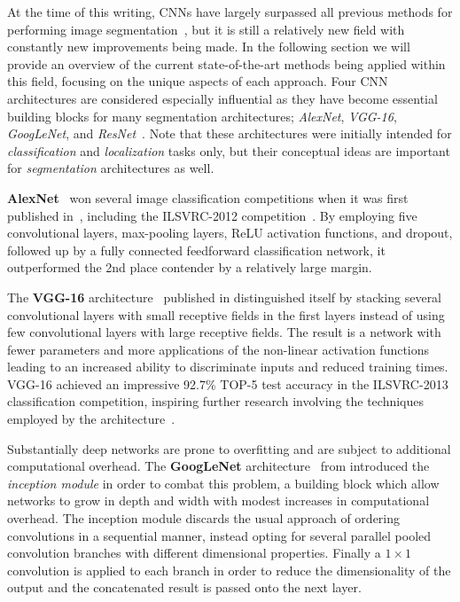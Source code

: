 At the time of this writing, CNNs have largely surpassed all previous methods for performing image segmentation~\cite{segmentation-overview}, but it is still a relatively new field with constantly new improvements being made.
In the following section we will provide an overview of the current state-of-the-art methods being applied within this field, focusing on the unique aspects of each approach.
Four CNN architectures are considered especially influential as they have become essential building blocks for many segmentation architectures; \textit{AlexNet}, \textit{VGG-16}, \textit{GoogLeNet}, and \textit{ResNet}~\cite{segmentation-overview}.
Note that these architectures were initially intended for \textit{classification} and \textit{localization} tasks only, but their conceptual ideas are important for \textit{segmentation} architectures as well.

\textbf{AlexNet}~\cite{segmentation-alexnet} won several image classification competitions when it was first published in~\citeyear{segmentation-alexnet}, including the ILSVRC-2012 competition~\cite{segmentation-overview}.
By employing five convolutional layers, max-pooling layers, ReLU activation functions, and dropout, followed up by a fully connected feedforward classification network, it outperformed the 2nd place contender by a relatively large margin.

The \textbf{VGG-16} architecture~\cite{vgg-16} published in \citeyear{vgg-16} distinguished itself by stacking several convolutional layers with small receptive fields in the first layers instead of using few convolutional layers with large receptive fields.
The result is a network with fewer parameters and more applications of the non-linear activation functions leading to an increased ability to discriminate inputs and reduced training times.
VGG-16 achieved an impressive 92.7\% TOP-5 test accuracy in the ILSVRC-2013 classification competition, inspiring further research involving the techniques employed by the architecture~\cite{segmentation-overview}.

Substantially deep networks are prone to overfitting and are subject to additional computational overhead.
The \textbf{GoogLeNet} architecture~\cite{googlenet} from \citeyear{googlenet} introduced the \textit{inception module} in order to combat this problem, a building block which allow networks to grow in depth and width with modest increases in computational overhead.
The inception module discards the usual approach of ordering convolutions in a sequential manner, instead opting for several parallel pooled convolution branches with different dimensional properties.
Finally a $1 \times 1$ convolution is applied to each branch in order to reduce the dimensionality of the output and the concatenated result is passed onto the next layer.

